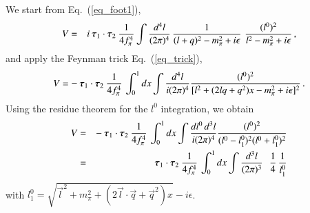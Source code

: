 \documentclass[sort&compress,preprint,3p]{elsarticle}
\newcommand{\bbox}[1]{\mbox{\boldmath $#1$}}
\begin{document}
We start from Eq.~(\ref{eq_foot1}),
\begin{eqnarray}
V &=& i
\: \bbox{\tau}_1 \cdot \bbox{\tau}_2 \:
\frac{1}{4 f_\pi^4} 
\int \frac{d^4 l}{(2\pi)^4} \,
\frac{1}{(l+q)^2-m_\pi^2+i\epsilon} \,\,
\frac{(l^0)^2}{l^2-m_\pi^2+i\epsilon}
\,,
\end{eqnarray}
%
and apply the Feynman trick Eq.~(\ref{eq_trick}),
%
\begin{equation}
V = -
\: \bbox{\tau}_1 \cdot \bbox{\tau}_2 \:
\frac{1}{4 f_\pi^4} \,
 \int_0^1 dx \int \frac{d^{4} l}{i(2 \pi)^4}
 \frac{(l^0)^2}
{[l^2+(2lq+q^2)x-m_\pi^2 + i\epsilon]^2}
\,.
\end{equation}
%
Using the residue theorem for the $l^0$ integration, we obtain
%
\begin{eqnarray}
V &=& -
\: \bbox{\tau}_1 \cdot \bbox{\tau}_2 \:
\frac{1}{4 f_\pi^4} \,
\int_0^1 dx \int \frac{dl^0\,d^{3}l}{i(2 \pi)^4}
\frac{(l^0)^2}
{({l^0}-{l^0_1})^2 ({l^0}+{l^0_1})^2} 
\nonumber \\ &=& 
\: \bbox{\tau}_1 \cdot \bbox{\tau}_2 \:
\frac{1}{4 f_\pi^4} \,
\int_0^1 dx \int \frac{d^{3}l}{(2 \pi)^{3}}
\,\, 
\,\, \frac{1}{4} \, 
\frac{1}{l_1^0}
\end{eqnarray}
with
$l^0_1 = \sqrt{\vec{l}^2+m_\pi^2+(2\vec{l}\cdot\vec{q}+\vec{q}^2)x} 
-i\epsilon$.
 
\end{document}
